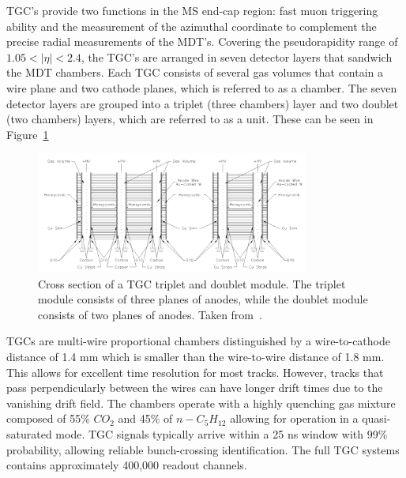 TGC's provide two functions in the MS end-cap region\@: fast muon triggering ability and the measurement of the azimuthal coordinate to complement the precise radial measurements of the MDT's. Covering the pseudorapidity range of $1.05 < |\eta| < 2.4$, the TGC's are arranged in seven detector layers that sandwich the MDT chambers. Each TGC consists of several gas volumes that contain a wire plane and two cathode planes, which is referred to as a chamber. The seven detector layers are grouped into a triplet (three chambers) layer and two doublet (two chambers) layers, which are referred to as a unit. These can be seen in Figure~\ref{fig:tgc_chamber}

\begin{figure}[htp]
    \centering
    \includegraphics[width=0.8\textwidth]{figures/atlas/atlas_tgc_chamber.png}
    \caption{Cross section of a TGC triplet and doublet module. The triplet module consists of three planes of anodes, while the doublet module consists of two planes of anodes. Taken from~\cite{atlas_collaboration_paper}.}\label{fig:tgc_chamber}
\end{figure}

TGCs are multi-wire proportional chambers distinguished by a wire-to-cathode distance of 1.4 mm which is smaller than the wire-to-wire distance of 1.8 mm. This allows for excellent time resolution for most tracks. However, tracks that pass perpendicularly between the wires can have longer drift times due to the vanishing drift field. The chambers operate with a highly quenching gas mixture composed of 55\% $CO_2$ and 45\% of $n-C_5H_{12}$ allowing for operation in a quasi-saturated mode. TGC signals typically arrive within a 25 ns window with 99\% probability, allowing reliable bunch-crossing identification. The full TGC systems contains approximately 400,000 readout channels.
